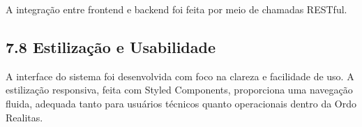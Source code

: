 \documentclass[12pt,a4paper]{report}
\begin{document}
A integração entre frontend e backend foi feita por meio de chamadas RESTful.

\subsection{7.8 Estilização e Usabilidade}

A interface do sistema foi desenvolvida com foco na clareza e facilidade de uso. A estilização responsiva, feita com Styled Components, proporciona uma navegação fluida, adequada tanto para usuários técnicos quanto operacionais dentro da Ordo Realitas.





\end{document}

